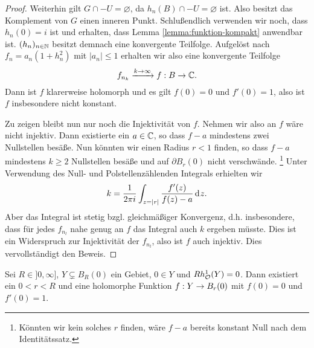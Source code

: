 \begin{proof}
  Weiterhin gilt $G \cap -U = \varnothing$, da $h_n(B) \cap -U =
  \varnothing$ ist. Also besitzt das Komplement von $G$ einen inneren Punkt.
  Schlußendlich verwenden wir noch, dass $h_n(0) = i$ ist und
  erhalten, dass Lemma \ref{lemma:funktion-kompakt} anwendbar ist.
  $(h_n)_{n \in \mathbb{N}}$ besitzt demnach
  eine konvergente Teilfolge. Aufgelöst nach $f_n =
  a_n(1 + h_n^2)$ mit $|a_n| \leq 1$ erhalten wir also eine
  konvergente Teilfolge
  \[
  f_{n_k} \xrightarrow{k \rightarrow \infty} f: B \rightarrow \mathbb{C}.
  \]
  Dann ist $f$ klarerweise holomorph und es gilt $f(0) = 0$ und $f'(0)
  = 1$, also ist $f$ insbesondere nicht konstant.

  Zu zeigen bleibt nun nur noch die Injektivität von $f$.
  Nehmen wir also an $f$ wäre nicht injektiv. Dann existierte ein $a \in \mathbb{C}$,
  so dass $f-a$ mindestens zwei Nullstellen besäße. Nun könnten wir
  einen Radius $r < 1$ finden, so dass $f-a$ mindestens $k\geq 2$
  Nullstellen besäße und auf $\partial B_r(0)$ nicht
  verschwände. \footnote{Könnten wir kein solches $r$ finden, wäre $f-a$
  bereits konstant Null nach dem Identitätssatz.} Unter Verwendung des
  Null- und Polstellenzählenden Integrals erhielten wir
  \[
  k = \frac1{2\pi i} \int_{z = |r|} \frac{f'(z)}{f(z) - a} \d[z].
  \]
  Aber das Integral ist stetig bzgl. gleichmäßiger Konvergenz,
  d.h. insbesondere, dass für jedes $f_{n_l}$ nahe genug an $f$ das
  Integral auch $k$ ergeben müsste. Dies ist ein Widerspruch zur
  Injektivität der $f_{n_l}$, also ist $f$ auch injektiv. 
  Dies vervollständigt den Beweis.
\end{proof}

\begin{lemma}
  \label{lemma:bihol-kreis}
  Sei $R \in ]0, \infty]$, $Y \subsetneq B_R(0)$ ein Gebiet, $0 \in Y$
  und $Rh_{\mathcal{O}}^1(Y) = 0$. 
  Dann existiert ein $0< r <R$ und eine holomorphe Funktion $f: Y \rightarrow B_r(0)$ mit $f(0) =
  0$ und $f'(0) = 1$.
\end{lemma}


